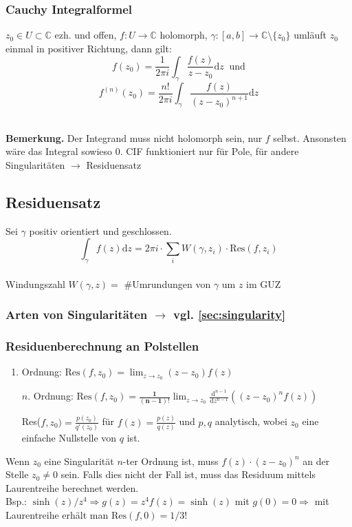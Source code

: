 \documentclass[8pt, a4paper, landscape, fleqn]{scrartcl}
\newenvironment {example}
				{\begin{itshape} \begin{small}}
				{\end{small} \end{itshape}}
\def\C{\mathbb{C}}
\def\d{\text{d}}
\def\Res{\text{Res}}
\begin{document}
\begin{multicols*}{3}
        \subsubsection{Cauchy Integralformel}
        $z_0 \in U \subset \C$ ezh. und offen, $f: U \to \C$ holomorph, $\gamma : [a, b] \to \C \setminus \{z_0\}$ umläuft $z_0$ einmal in positiver Richtung, dann gilt: $$ f(z_0) = \frac{1}{2\pi i}\int_\gamma \frac{f(z)}{z-z_0} \d z \ \text{ und}$$ $$ f^{(n)}(z_0) = \frac{n!}{2\pi i}\int_\gamma \frac{f(z)}{(z-z_0)^{n+1}}\d z$$ \\
        \begin{example}
		    \textbf{Bemerkung.}
		    Der Integrand muss nicht holomorph sein, nur $f$ selbst. Ansonsten wäre das Integral sowieso 0. CIF funktioniert nur für Pole, für andere Singularitäten $\rightarrow$ Residuensatz
		\end{example}
		  
        \subsection{Residuensatz}
	    Sei $\gamma$ positiv orientiert und geschlossen. 
	    $$ \int_\gamma f(z) \d z = 2\pi i \cdot \sum_i W(\gamma, z_i) \cdot \Res(f, z_i) $$ \\
	    Windungszahl $W(\gamma, z) = $ \#Umrundungen von $\gamma$ um $z$ im GUZ
        
        \subsubsection{Arten von Singularitäten $\to$ vgl. \ref{sec:singularity}}

	    \subsubsection{Residuenberechnung an Polstellen}
	    \begin{enumerate}
	        \item Ordnung: $\Res(f, z_0) = \lim_{z \to z_0} (z-z_0)f(z)$ 
	        \item[$n$.] Ordnung: $\Res(f, z_0) = \mathbf{\frac{1}{(n-1)!}} \lim_{z\to z_0}\frac{\d^{n-1}}{\d z^{n-1}}((z-z_0)^nf(z))$
	        \item[] Res($f,z_0) = \frac{p(z_0)}{q'(z_0)}$ für $f(z) = \frac{p(z)}{q(z)}$ und $p,q$ analytisch, wobei $z_0$ eine einfache Nullstelle von $q$ ist.
	    \end{enumerate}
	    Wenn $z_0$ eine Singularität $n$-ter Ordnung ist, muss $f(z)\cdot(z-z_0)^n$ an der Stelle $z_0 \neq 0$ sein. Falls dies nicht der Fall ist, muss das Residuum mittels Laurentreihe berechnet werden.\\Bsp.: $\sinh(z)/z^4 \Rightarrow g(z) = z^4f(z) = \sinh(z)$ mit $g(0) = 0 \Rightarrow$ mit Laurentreihe erhält man $\Res(f, 0) = 1/3!$ 
	    

\end{multicols*}
\end{document}
